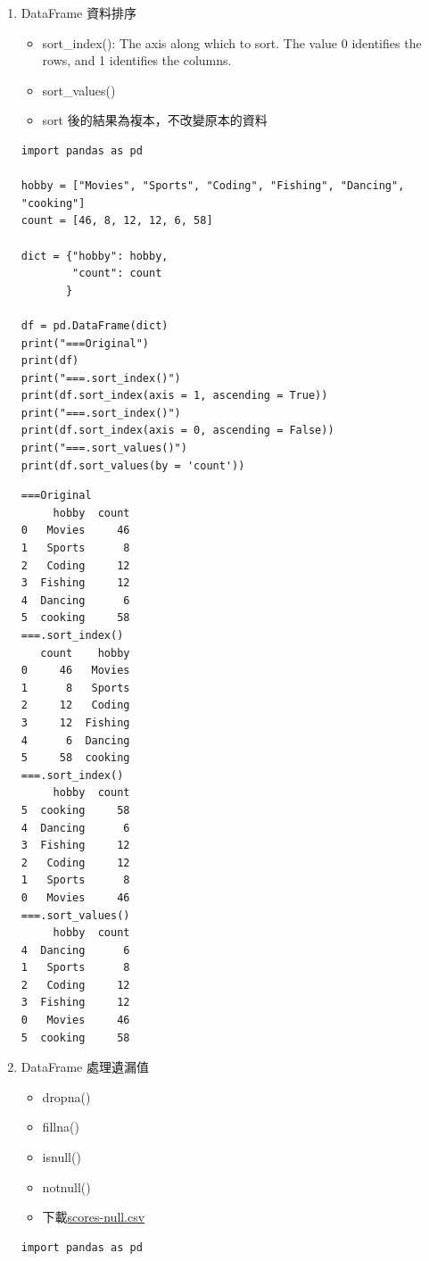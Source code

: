 \documentclass[a4paper,12pt]{article}
\begin{document}
\begin{enumerate}
\item DataFrame 資料排序
\label{sec:orgcfafc22}
\begin{itemize}
\item sort\_index(): The axis along which to sort. The value 0 identifies the rows, and 1 identifies the columns.\\
\item sort\_values()\\
\item sort 後的結果為複本，不改變原本的資料\\
\end{itemize}
\lstset{breaklines=true,language=Python,label= ,caption= ,captionpos=b,firstnumber=1,numbers=left}
\begin{lstlisting}
import pandas as pd

hobby = ["Movies", "Sports", "Coding", "Fishing", "Dancing", "cooking"]
count = [46, 8, 12, 12, 6, 58]

dict = {"hobby": hobby,
        "count": count
       }

df = pd.DataFrame(dict)
print("===Original")
print(df)
print("===.sort_index()")
print(df.sort_index(axis = 1, ascending = True))
print("===.sort_index()")
print(df.sort_index(axis = 0, ascending = False))
print("===.sort_values()")
print(df.sort_values(by = 'count'))
\end{lstlisting}

\begin{verbatim}
===Original
     hobby  count
0   Movies     46
1   Sports      8
2   Coding     12
3  Fishing     12
4  Dancing      6
5  cooking     58
===.sort_index()
   count    hobby
0     46   Movies
1      8   Sports
2     12   Coding
3     12  Fishing
4      6  Dancing
5     58  cooking
===.sort_index()
     hobby  count
5  cooking     58
4  Dancing      6
3  Fishing     12
2   Coding     12
1   Sports      8
0   Movies     46
===.sort_values()
     hobby  count
4  Dancing      6
1   Sports      8
2   Coding     12
3  Fishing     12
0   Movies     46
5  cooking     58
\end{verbatim}

\item DataFrame 處理遺漏值
\label{sec:org44b529c}
\begin{itemize}
\item dropna()\\
\item fillna()\\
\item isnull()\\
\item notnull()\\
\item 下載\url{scores-null.csv}\\
\end{itemize}
\lstset{breaklines=true,language=Python,label= ,caption= ,captionpos=b,firstnumber=1,numbers=left}
\begin{lstlisting}
import pandas as pd


\end{lstlisting}
\end{enumerate}
\end{document}
